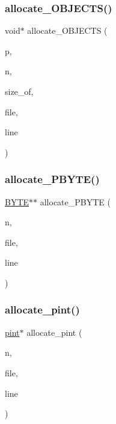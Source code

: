 \subsubsection{\texorpdfstring{allocate\+\_\+\+O\+B\+J\+E\+C\+T\+S()}{allocate\_OBJECTS()}}
{\footnotesize\ttfamily void$\ast$ allocate\+\_\+\+O\+B\+J\+E\+C\+TS (\begin{DoxyParamCaption}\item[{void $\ast$}]{p,  }\item[{\mbox{\hyperlink{galois_8h_a09fddde158a3a20bd2dcadb609de11dc}{I\+NT}}}]{n,  }\item[{int}]{size\+\_\+of,  }\item[{const char $\ast$}]{file,  }\item[{int}]{line }\end{DoxyParamCaption})}

\mbox{\label{_g_a_l_o_i_s_2memory_8_c_a089bee2036889c1f3d02c163f4b5d6ab}} 
\subsubsection{\texorpdfstring{allocate\+\_\+\+P\+B\+Y\+T\+E()}{allocate\_PBYTE()}}
{\footnotesize\ttfamily \mbox{\hyperlink{galois_8h_ab6cc7b4aeb6ea31aba2b3fbfc83ff5e6}{B\+Y\+TE}}$\ast$$\ast$ allocate\+\_\+\+P\+B\+Y\+TE (\begin{DoxyParamCaption}\item[{\mbox{\hyperlink{galois_8h_a09fddde158a3a20bd2dcadb609de11dc}{I\+NT}}}]{n,  }\item[{const char $\ast$}]{file,  }\item[{int}]{line }\end{DoxyParamCaption})}

\mbox{\label{_g_a_l_o_i_s_2memory_8_c_a3a50cc984522bb09aab287d0715d4ca8}} 
\subsubsection{\texorpdfstring{allocate\+\_\+pint()}{allocate\_pint()}}
{\footnotesize\ttfamily \mbox{\hyperlink{ovoid_8h_a8df55fc7a73722f0cb22df9c9bcc5c9b}{pint}}$\ast$ allocate\+\_\+pint (\begin{DoxyParamCaption}\item[{\mbox{\hyperlink{galois_8h_a09fddde158a3a20bd2dcadb609de11dc}{I\+NT}}}]{n,  }\item[{const char $\ast$}]{file,  }\item[{int}]{line }\end{DoxyParamCaption})}

